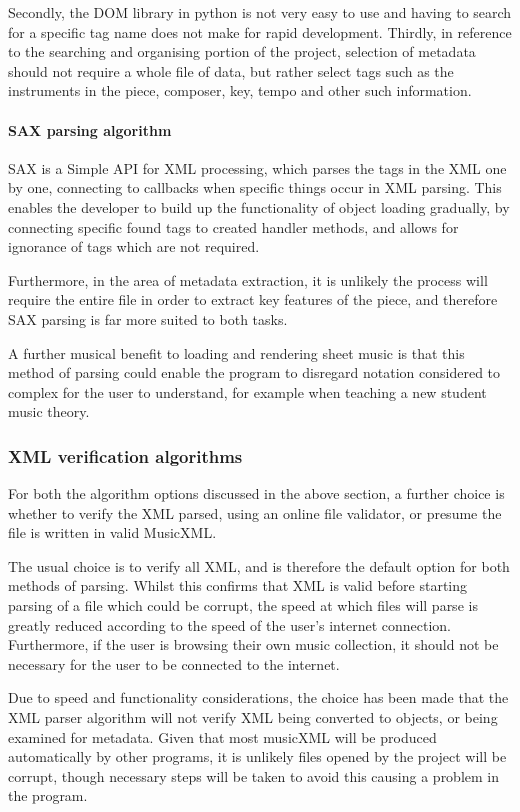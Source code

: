 Secondly, the DOM library in python is not very easy to use and having to search for a specific tag name does not make for rapid development.
Thirdly, in reference to the searching and organising portion of the project, selection of metadata should not require a whole file of data, but rather select tags such as the instruments in the piece, composer, key, tempo and other such information.

\paragraph{SAX parsing algorithm}
SAX is a Simple API for XML processing, which parses the tags in the XML one by one, connecting to callbacks when specific things occur in XML parsing. This enables the developer to build up the functionality of object loading gradually, by connecting specific found tags to created handler methods, and allows for ignorance of tags which are not required.

Furthermore, in the area of metadata extraction, it is unlikely the process will require the entire file in order to extract key features of the piece, and therefore SAX parsing is far more suited to both tasks.

A further musical benefit to loading and rendering sheet music is that this method of parsing could enable the program to disregard notation considered to complex for the user to understand, for example when teaching a new student music theory.

\subsubsection{XML verification algorithms}
For both the algorithm options discussed in the above section, a further choice is whether to verify the XML parsed, using an online file validator, or presume the file is written in valid MusicXML. 

The usual choice is to verify all XML, and is therefore the default option for both methods of parsing. Whilst this confirms that XML is valid before starting parsing of a file which could be corrupt, the speed at which files will parse is greatly reduced according to the speed of the user's internet connection.
Furthermore, if the user is browsing their own music collection, it should not be necessary for the user to be connected to the internet.

Due to speed and functionality considerations, the choice has been made that the XML parser algorithm will not verify XML being converted to objects, or being examined for metadata. Given that most musicXML will be produced automatically by other programs, it is unlikely files opened by the project will be corrupt, though necessary steps will be taken to avoid this causing a problem in the program.

